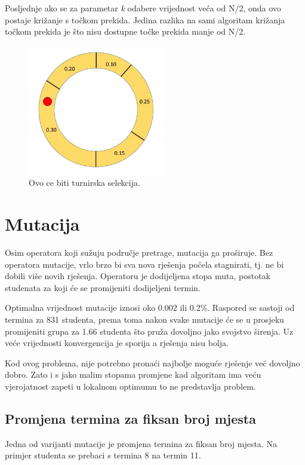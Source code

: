 \documentclass[times, utf8, zavrsni]{fer}
\begin{document}
\newpage

Posljednje ako se za parametar \emph{k} odabere vrijednost veća od N/2, onda ovo postaje križanje s točkom prekida. Jedina razlika na sami algoritam križanja točkom prekida je što nisu dostupne točke prekida manje od N/2.

\begin{figure}[htb]
\centering
\includegraphics[width=6cm]{images/rulet.png}
\caption{Ovo ce biti turnirska selekcija.}
\label{fig:rulet}
\end{figure}

\section{Mutacija}

Osim operatora koji sužuju područje pretrage, mutacija ga proširuje. Bez operatora mutacije, vrlo brzo bi sva nova rješenja počela stagnirati, tj. ne bi dobili više novih rješenja. Operatoru je dodijeljena stopa muta, postotak studenata za koji će se promijeniti dodijeljeni termin.

Optimalna vrijednost mutacije  iznosi oko 0.002 ili 0.2\%. Raspored se sastoji od termina za 831 studenta, prema toma nakon svake mutacije će se u prosjeku promijeniti grupa za 1.66 studenta što pruža dovoljno jako svojstvo širenja. Uz veće vrijednosti konvergencija je sporija a rješenja nisu bolja.

Kod ovog problema, nije potrebno pronaći najbolje moguće rješenje već dovoljno dobro. Zato i s jako malim stopama promjene kad algoritam ima veću vjerojatnost zapeti u lokalnom optimumu to ne predstavlja problem.

\subsection{Promjena termina za fiksan broj mjesta}

Jedna od varijanti mutacije je promjena termina za fiksan broj mjesta. Na primjer studenta se prebaci s termina 8 na termin 11.
\end{document}
